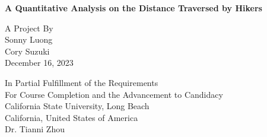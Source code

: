 \documentclass[onecolumn, 12 pt, doublespace, fullpage, a4paper]{report}
\begin{document}

\thispagestyle{empty}
\addvspace{5mm}  %


\begin{center}
\begin{doublespace}
{\textbf{{\large A Quantitative Analysis on the Distance Traversed by Hikers}}}%
\end{doublespace}

\vspace{10mm}
{A Project By}\\
{Sonny Luong}\\
{Cory Suzuki}\\
{December 16, 2023}%

\vspace{30mm}

{ In Partial Fulfillment of the Requirements}\\[12pt]
{ For Course Completion and the Advancement to Candidacy}\\[12pt]
\vfill
{California State University, Long Beach }\\
{California, United States of America}\\
{Dr. Tianni Zhou}
\vfill

\end{center}
\newpage

\chaptertitlefont{\fontsize{14}{15}\selectfont\centering}  






\begin{onehalfspacing}%

\tableofcontents

\printglossary[type=\acronymtype,style=long3col, title=\centerline{LIST OF ABBREVIATIONS}, toctitle=List of Abbreviations, nonumberlist=true] 

\printglossary[type=symbols,style=long3col, title=\centerline{LIST OF SYMBOLS}, toctitle=List of Symbols, nonumberlist=true]


\end{onehalfspacing}
\end{document}
